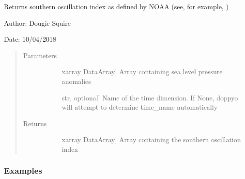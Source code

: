 \documentclass[letterpaper,10pt,english]{sphinxmanual}
\begin{document}

\begin{fulllineitems}
\label{\detokenize{diagnostic_doc:diagnostic.soi}}
Returns southern oscillation index as defined by NOAA (see, for example,                 )

\begin{DUlineblock}{0em}
\item[] Author: Dougie Squire
\item[] Date: 10/04/2018
\end{DUlineblock}
\begin{quote}\begin{description}
\item[{Parameters}] \leavevmode\begin{description}
\item[{}] \leavevmode{[}xarray DataArray{]}
Array containing sea level pressure anomalies

\item[{}] \leavevmode{[}str, optional{]}
Name of the time dimension. If None, doppyo will attempt to determine time\_name                     automatically

\end{description}

\item[{Returns}] \leavevmode\begin{description}
\item[{}] \leavevmode{[}xarray DataArray{]}
Array containing the southern oscillation index

\end{description}

\end{description}\end{quote}
\subsubsection*{Examples}


\end{fulllineitems}
\end{document}
